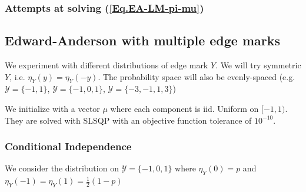 \documentclass[12pt]{article}
\numberwithin{equation}{section}
\begin{document}
\subsubsection{Attempts at solving (\ref{Eq.EA-LM-pi-mu})}

\newpage

\subsection{Edward-Anderson with multiple edge marks}

We experiment with different distributions of edge mark $Y$. We will try symmetric $Y$, i.e. $\eta_Y(y) = \eta_Y(-y)$.
The probability space will also be evenly-spaced (e.g. $\mathcal{Y}=\{-1, 1\}$, $\mathcal{Y}=\{-1,0, 1\}$, $\mathcal{Y}=\{-3, -1, 1, 3\}$)

We initialize with a vector $\mu$ where each component is iid. Uniform on $[-1, 1)$. They are solved with SLSQP with an objective function tolerance
of $10^{-10}$.

\subsubsection{Conditional Independence}

We consider the distribution on $\mathcal{Y}=\{-1, 0, 1\}$ where $\eta_Y(0)=p$ and $\eta_Y(-1)=\eta_Y(1)=\frac12(1-p)$
\end{document}
